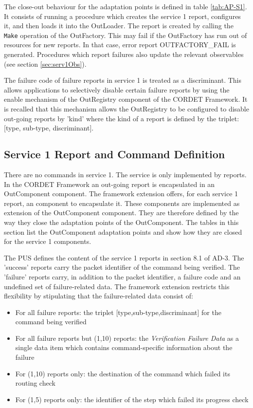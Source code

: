 \documentclass{pnp_article}
\begin{document}
The close-out behaviour for the adaptation points is defined in table \ref{tab:AP-S1}. It consists of running a procedure which creates the service 1 report, configures it, and then loads it into the OutLoader. The report is created by calling the \texttt{Make} operation of the OutFactory. This may fail if the OutFactory has run out of resources for new reports. In that case, error report OUTFACTORY\_FAIL is generated. Procedures which report failures also update the relevant observables (see section \ref{sec:serv1Obs}).

The failure code of failure reports in service 1 is treated as a discriminant. This allows applications to selectively disable certain failure reports by using the enable mechanism of the OutRegistry component of the CORDET Framework. It is recalled that this mechanism allows the OutRegistry to be configured to disable out-going reports by 'kind' where the kind of a report is defined by the triplet: [type, sub-type, discriminant]. 


\subsection{Service 1 Report and Command Definition}\label{sec:serv1RepDef}
There are no commands in service 1. The service is only implemented by reports. In the CORDET Framework an out-going report is encapsulated in an OutComponent component. The framework extension offers, for each service 1 report, an component to encapsulate it. These components are implemented as extension of the OutComponent component. They are therefore defined by the way they close the adaptation points of the OutComponent. The tables in this section list the OutComponent adaptation points and show how they are closed for the service 1 components.

The PUS defines the content of the service 1 reports in section 8.1 of AD-3. The 'success' reports carry the packet identifier of the command being verified. The 'failure' reports carry, in addition to the packet identifier, a failure code and an undefined set of failure-related data. The framework extension restricts this flexibility by stipulating that the failure-related data consist of: 

\begin{itemize}
\item For all failure reports: the triplet [type,sub-type,discriminant] for the command being verified
\item For all failure reports but (1,10) reports: the \textit{Verification Failure Data} as a single data item which contains command-specific information about the failure 
\item For (1,10) reports only: the destination of the command which failed its routing check
\item For (1,5) reports only: the identifier of the step which failed its progress check
\end{itemize}
\end{document}
